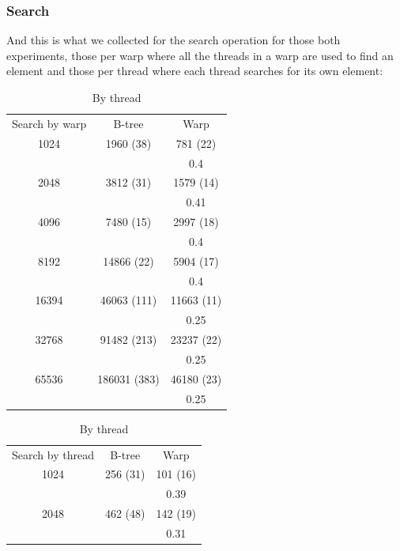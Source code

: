 \subsubsection{Search}

And this is what we collected for the search operation for those both experiments, those per warp where all the threads in a warp are used to find an element and those per thread where each thread searches for its own element:

\begin{table}[!htb]
    \caption{Time to get K elements with 64-bit keys (in µs)}
    \begin{minipage}{.5\linewidth}
      \label{getbywarp}
      \caption{By warp}
      \centering
\begin{tabular}{ccc}
Search by warp & B-tree   & Warp       \\
1024    & 1960 (38)    & 781 (22)   \\
        &              & 0.4        \\
2048    & 3812 (31)    & 1579 (14)  \\
        &              & 0.41       \\
4096    & 7480 (15)    & 2997 (18)  \\
        &              & 0.4        \\
8192    & 14866 (22)   & 5904 (17)  \\
        &              & 0.4        \\
16394   & 46063 (111)  & 11663 (11) \\
        &              & 0.25       \\
32768   & 91482 (213)  & 23237 (22) \\
        &              & 0.25       \\
65536   & 186031 (383) & 46180 (23) \\
        &              & 0.25      
\end{tabular}
    \end{minipage}%
    \begin{minipage}{.5\linewidth}
      \centering
        \caption{By thread}
\begin{tabular}{ccc}
Search by thread & B-tree      & Warp      \\
1024          & 256 (31)    & 101 (16)  \\
              &             & 0.39      \\
2048          & 462 (48)    & 142 (19)  \\
              &             & 0.31      \\

\end{tabular}
\end{minipage}
\end{table}
